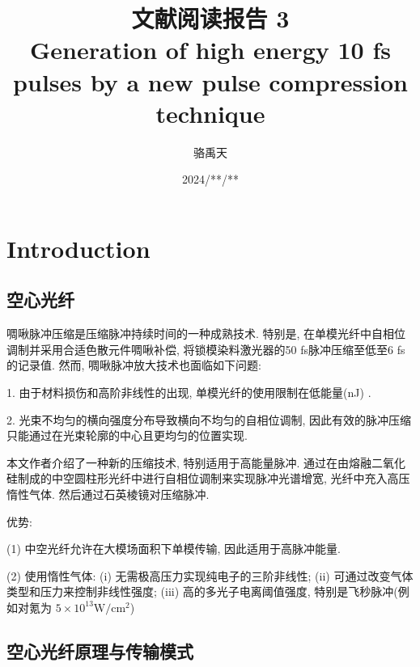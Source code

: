 \documentclass[14pt,a4paper,oneside]{article}
\title{\textbf{文献阅读报告 3\\Generation of high energy 10 fs pulses by a new pulse compression technique}}                           %
\author{骆禹天}                                           %
\date{2024/**/**}                                        %
\numberwithin{equation}{subsection}             %
\numberwithin{figure}{subsection}               %
\begin{document}

\maketitle

\setcounter{page}{1}          %


\tableofcontents              %

\newpage                      
\setcounter{page}{1}          %








\section{Introduction}

\subsection{空心光纤}

啁啾脉冲压缩是压缩脉冲持续时间的一种成熟技术. 特别是, 在单模光纤中自相位调制并采用合适色散元件啁啾补偿, 将锁模染料激光器的50 fs脉冲压缩至低至6 fs的记录值. 然而, 啁啾脉冲放大技术也面临如下问题: 

1. 由于材料损伤和高阶非线性的出现, 单模光纤的使用限制在低能量(nJ) . 

2. 光束不均匀的横向强度分布导致横向不均匀的自相位调制, 因此有效的脉冲压缩只能通过在光束轮廓的中心且更均匀的位置实现. 

本文作者介绍了一种新的压缩技术, 特别适用于高能量脉冲. 通过在由熔融二氧化硅制成的中空圆柱形光纤中进行自相位调制来实现脉冲光谱增宽, 光纤中充入高压惰性气体. 然后通过石英棱镜对压缩脉冲. 

优势: 

(1) 中空光纤允许在大模场面积下单模传输, 因此适用于高脉冲能量. 

(2) 使用惰性气体: (i) 无需极高压力实现纯电子的三阶非线性; (ii) 可通过改变气体类型和压力来控制非线性强度; (iii) 高的多光子电离阈值强度, 特别是飞秒脉冲(例如对氪为 $5\times 10^{13} \mathrm{W/cm^2}$) 

\subsection{空心光纤原理与传输模式}
\end{document}

